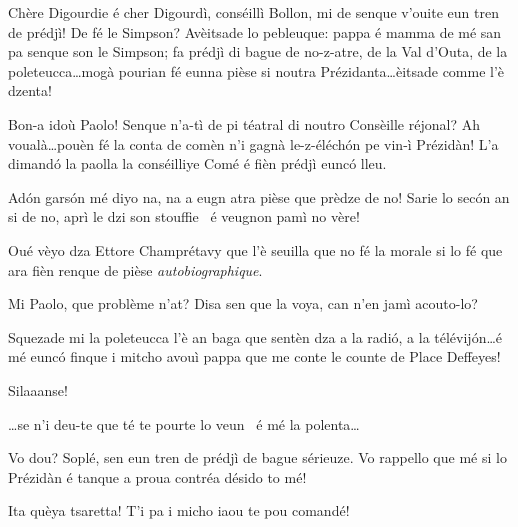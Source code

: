 \begin{drama}

\Dallasspeaks Chère Digourdie é cher Digourdì, conséillì Bollon, mi de senque v'ouite eun tren de prédjì! De fé le Simpson? Avèitsade lo pebleuque: pappa é mamma de mé san pa senque son le Simpson; fa prédjì di bague de no-z-atre, de la Val d'Outa, de la poleteucca\ldots mogà pourian fé eunna pièse si noutra Prézidanta\ldots èitsade comme l'è dzenta!

\Presidanspeaks Bon-a idoù Paolo! Senque n'a-tì de pi téatral di noutro Consèille réjonal? Ah voualà\ldots pouèn fé la conta de comèn n'i gagnà le-z-éléch\'on pe vin-ì Prézidàn!  L’a dimand\'o la paolla la conséilliye Comé é fièn prédjì eunc\'o lleu.

\Sophiespeaks Ad\'on gars\'on mé diyo na, na a eugn atra pièse que prèdze de no! Sarie lo sec\'on an si de no, aprì le dzi son stouffie \stufo\ é veugnon pamì no vère!

\Cimaspeaks Oué vèyo dza Ettore Champrétavy que l'è seuilla  que no fé la morale si lo fé que ara fièn renque de pièse \textit{autobiographique}.

\Joellespeaks Mi Paolo, que problème n'at? Disa sen que la voya, can n'en jamì acouto-lo?


\Eyviaspeaks
Squezade mi la poleteucca l'è an baga que sentèn dza a la radi\'o, a la télévij\'on\ldots é mé eunc\'o finque i mitcho avouì pappa que me conte le counte de Place Deffeyes!


\Presidanspeaks{} Silaaanse! 


\Secreteospeaks \ldots se n'i deu-te que té te pourte lo veun \wine\ é mé la polenta\ldots


\Presidanspeaks Vo dou? Soplé, sen eun tren de prédjì de bague sérieuze.  Vo rappello que mé si lo Prézidàn é tanque a proua contréa désido to mé!

\Marcospeaks Ita quèya tsaretta! T'i pa i micho iaou te pou comandé!


\end{drama}
